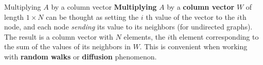 \begin{textbox}{Multiplying $A$ by a column vector}
  \textbf{Multiplying} $A$ by a \textbf{column vector} $W$ of length $1\times N$ can be thought as setting the $i$ th value of the vector to the $i$th node, and each node \textit{sending} its value to its neighbors (for undirected graphs). The result is a column vector with $N$ elements, the $i$th element corresponding to the sum of the values of its neighbors in $W$. This is convenient when working with \textbf{random walks} or \textbf{diffusion} phenomenon.
\end{textbox}






